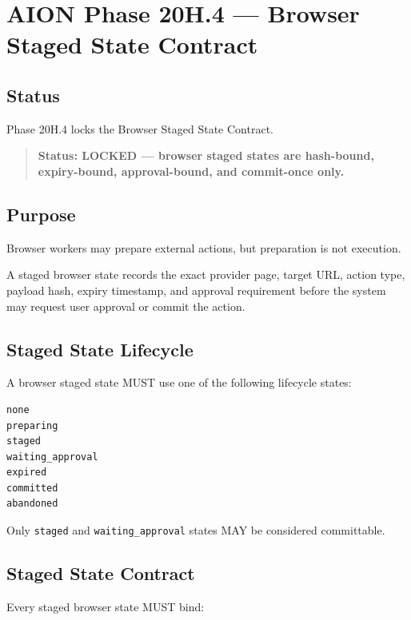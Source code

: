 \section{AION Phase 20H.4 --- Browser Staged State Contract}
\label{sec:aion-phase20h4-browser-staged-state-contract}

\subsection{Status}

Phase 20H.4 locks the Browser Staged State Contract.

\begin{quote}
\textbf{Status: LOCKED --- browser staged states are hash-bound, expiry-bound, approval-bound, and commit-once only.}
\end{quote}

\subsection{Purpose}

Browser workers may prepare external actions, but preparation is not execution.

A staged browser state records the exact provider page, target URL, action type, payload hash, expiry timestamp, and approval requirement before the system may request user approval or commit the action.

\subsection{Staged State Lifecycle}

A browser staged state MUST use one of the following lifecycle states:

\begin{verbatim}
none
preparing
staged
waiting_approval
expired
committed
abandoned
\end{verbatim}

Only \texttt{staged} and \texttt{waiting\_approval} states MAY be considered committable.

\subsection{Staged State Contract}

Every staged browser state MUST bind:

